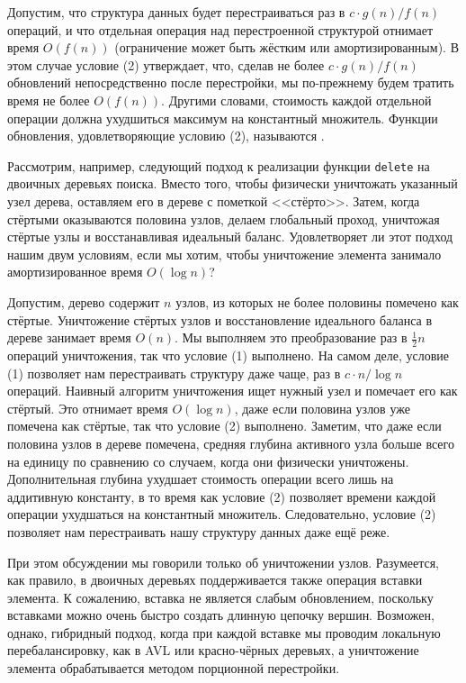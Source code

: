 Допустим, что структура данных будет перестраиваться раз в $c \cdot
g(n) / f(n)$ операций, и что отдельная операция над перестроенной
структурой отнимает время $O(f(n))$ (ограничение может быть жёстким
или амортизированным). В этом случае условие (2) утверждает, что,
сделав не более $c \cdot g(n) / f(n)$ обновлений непосредственно после
перестройки, мы по-прежнему будем тратить время не более
$O(f(n))$. Другими словами, стоимость каждой отдельной операции должна
ухудшиться максимум на константный множитель. Функции обновления,
удовлетворяющие условию (2), называются .

Рассмотрим, например, следующий подход к реализации функции
\lstinline!delete! на двоичных деревьях поиска. Вместо того, чтобы
физически уничтожать указанный узел дерева, оставляем его в дереве с
пометкой <<стёрто>>. Затем, когда стёртыми оказываются половина
узлов, делаем глобальный проход, уничтожая стёртые узлы и
восстанавливая идеальный баланс.  Удовлетворяет ли этот подход нашим
двум условиям, если мы хотим, чтобы уничтожение элемента занимало
амортизированное время $O(\log n)$?

Допустим, дерево содержит $n$ узлов, из которых не более половины
помечено как стёртые. Уничтожение стёртых узлов и восстановление
идеального баланса в дереве занимает время $O(n)$. Мы выполняем это
преобразование раз в $\frac{1}{2}n$ операций уничтожения, так что
условие (1) выполнено. На самом деле, условие (1) позволяет нам
перестраивать структуру даже чаще, раз в $c \cdot n / \log n$
операций.  Наивный алгоритм уничтожения ищет нужный узел и помечает его
как стёртый. Это отнимает время $O(\log n)$, даже если половина
узлов уже помечена как стёртые, так что условие (2) выполнено.
Заметим, что даже если половина узлов в дереве помечена, средняя
глубина активного узла больше всего на единицу по сравнению со
случаем, когда они физически уничтожены. Дополнительная глубина
ухудшает стоимость операции всего лишь на аддитивную константу, в то
время как условие (2) позволяет времени каждой операции ухудшаться на
константный множитель. Следовательно, условие (2) позволяет нам
перестраивать нашу структуру данных даже ещё реже.

При этом обсуждении мы говорили только об уничтожении
узлов. Разумеется, как правило, в двоичных деревьях поддерживается
также операция вставки элемента.  К сожалению, вставка не является
слабым обновлением, поскольку вставками можно очень быстро создать
длинную цепочку вершин.  Возможен, однако, гибридный подход, когда при
каждой вставке мы проводим локальную перебалансировку, как в
AVL или красно-чёрных деревьях, а уничтожение элемента обрабатывается
методом порционной перестройки.

